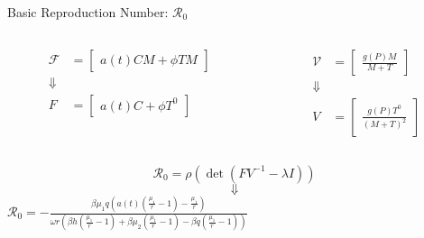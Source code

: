 \documentclass{beamer}
\begin{document}
\begin{frame}{Basic Reproduction Number: $\mathscr{R}_{0}$}
    \begin{columns}
        \begin{column}{0.5\textwidth}
            \begin{align*}
                \mathscr{F} &= \begin{bmatrix} a(t)CM+\phi TM \end{bmatrix}\\
                \Downarrow\\
                F &= \begin{bmatrix} a(t)C + \phi T^{0} \end{bmatrix}
            \end{align*}
        \end{column}
        \begin{column}{0.5\textwidth}
            \begin{align*}
                \mathscr{V} &= \begin{bmatrix} \frac{g(P)M}{M+T} \end{bmatrix}\\
                \Downarrow\\
                V &= \begin{bmatrix} \frac{g(P)T^{0}}{(M+T)^{2}} \end{bmatrix}
            \end{align*}
        \end{column}
    \end{columns}
    $$\mathscr{R}_{0} = \rho(\det(FV^{-1} - \lambda I))$$
    $$\Downarrow$$
    \centering
    $\displaystyle {\mathscr{R}}_{0} = - \frac{\beta \mu_{1}q(a(t)(\frac{\mu_{1}}{r}-1)-\frac{\mu_{1}}{r})}{\omega r (\beta h (\frac{\mu_{1}}{r}-1) + \beta \mu_{2} (\frac{\mu_{1}}{r}-1) - \beta q(\frac{\mu_{1}}{r}-1))}$
\end{frame}
\end{document}
